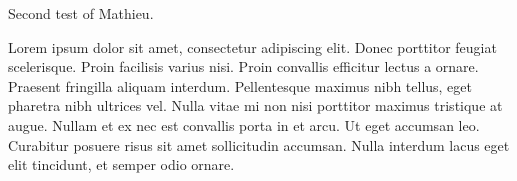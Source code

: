 Second test of Mathieu.

Lorem ipsum dolor sit amet, 
consectetur adipiscing elit. 
Donec porttitor feugiat scelerisque. 
Proin facilisis varius nisi. 
Proin convallis efficitur lectus a ornare. 
Praesent fringilla aliquam interdum. 
Pellentesque maximus nibh tellus, eget pharetra nibh ultrices vel. 
Nulla vitae mi non nisi porttitor maximus tristique at augue. 
Nullam et ex nec est convallis porta in et arcu. 
Ut eget accumsan leo. 
Curabitur posuere risus sit amet sollicitudin accumsan. 
Nulla interdum lacus eget elit tincidunt, et semper odio ornare.
